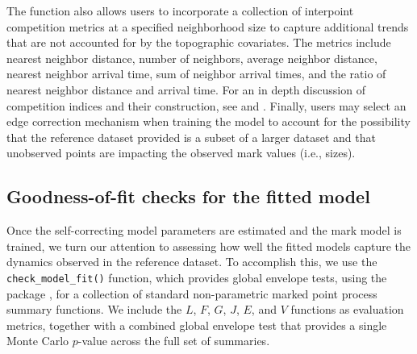 The function also allows users to incorporate a collection of interpoint competition
metrics at a specified neighborhood size to capture additional trends
that are not accounted for by the topographic covariates. The metrics
include nearest neighbor distance, number of neighbors, average neighbor
distance, nearest neighbor arrival time, sum of neighbor arrival times,
and the ratio of nearest neighbor distance and arrival time. For an in
depth discussion of competition indices and their construction, see
\citet{pommereningTammReviewTree2018} and \citet{contrerasEvaluatingTreeCompetition2011}. Finally, users may select an
edge correction mechanism when training the model to account for the
possibility that the reference dataset provided is a subset of a larger
dataset and that unobserved points are impacting the observed mark
values (i.e., sizes).

\subsection{Goodness-of-fit checks for the fitted model}\label{goodness-of-fit-checks-for-the-fitted-model}

Once the self-correcting model parameters are estimated and the mark
model is trained, we turn our attention to assessing how well the fitted
models capture the dynamics observed in the reference dataset. To
accomplish this, we use the \texttt{check\_model\_fit()} function, which
provides global envelope tests, using the  package
\citep{myllymakiGlobalEnvelopeTests2017}, for a collection of standard
non-parametric marked point process summary functions. {We include the \(L\), \(F\), \(G\), \(J\), \(E\), and \(V\) functions as evaluation metrics, together with a combined global envelope test that provides a single Monte Carlo \(p\)-value across the full set of summaries.}

